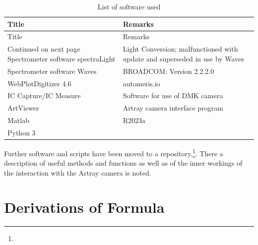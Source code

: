 \documentclass[twoside,openright,listof=numbered]{scrreprt}
\begin{document}
\begin{longtable}{p{}p{}}
    \caption{List of software used}
    \label{tab:software} \\
    \toprule 
    Title & Remarks \\
    \midrule
    \endfirsthead
    \toprule 
    Title & Remarks \\
    \midrule
    \endhead
    \midrule
    Continued on next page
    \endfoot
    \bottomrule
    \endlastfoot
    Spectrometer software spectraLight & Light Conversion; malfunctioned with update and superseded in use by Waves \\
    Spectrometer software Waves & BROADCOM; Version 2.2.2.0\\
    WebPlotDigitizer 4.6 & automeris.io\\
    IC Capture/IC Measure & Software for use of DMK camera\\
    ArtViewer & Artray camera interface program\\
    Matlab & R2023a\\
    Python 3& \\
    
\end{longtable}
Further software and scripts have been moved to a repository.\footnote{}. There a description of useful methods and functions as well as of the inner workings of the interaction with the Artray camera is noted.

\listoffigures
\listoftables

\chapter{Derivations of Formula}
\end{document}
